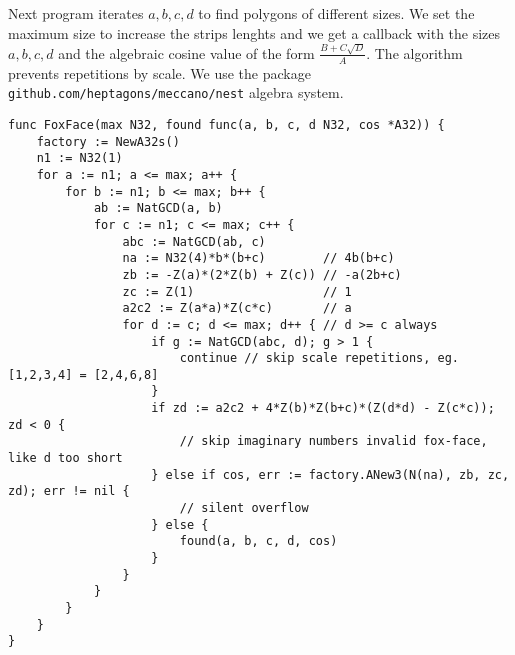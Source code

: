 \documentclass[11pt]{article}
\begin{document}
Next program iterates $a,b,c,d$ to find polygons of different sizes.
We set the maximum size to increase the strips lenghts and we get a callback with the
sizes $a,b,c,d$ and the algebraic cosine value of the form $\frac{B+C\sqrt{D}}{A}$. The algorithm prevents repetitions
by scale. We use the package \texttt{github.com/heptagons/meccano/nest} algebra system.
\begin{lstlisting}
func FoxFace(max N32, found func(a, b, c, d N32, cos *A32)) {
	factory := NewA32s()
	n1 := N32(1)
	for a := n1; a <= max; a++ {
		for b := n1; b <= max; b++ {
			ab := NatGCD(a, b)
			for c := n1; c <= max; c++ {
				abc := NatGCD(ab, c)
				na := N32(4)*b*(b+c)        // 4b(b+c)
				zb := -Z(a)*(2*Z(b) + Z(c)) // -a(2b+c)
				zc := Z(1)                  // 1
				a2c2 := Z(a*a)*Z(c*c)       // a
				for d := c; d <= max; d++ { // d >= c always
					if g := NatGCD(abc, d); g > 1 {
						continue // skip scale repetitions, eg. [1,2,3,4] = [2,4,6,8]
					}
					if zd := a2c2 + 4*Z(b)*Z(b+c)*(Z(d*d) - Z(c*c)); zd < 0 {
						// skip imaginary numbers invalid fox-face, like d too short
					} else if cos, err := factory.ANew3(N(na), zb, zc, zd); err != nil {
						// silent overflow
					} else {
						found(a, b, c, d, cos)
					}
				}
			}
		}
	}
}
\end{lstlisting}

\newcommand{\foxface}[6]{ %
 \begin{tikzpicture}
 \def\a{#3};\def\b{#4};\def\c{#5};\def\d{#6};\def\bc{#4+#5}
 \pgfmathsetmacro\max{max(#3,#4+#5)} %
 \pgfmathsetmacro\aA{-1.0*#3*(2.0*#4+#5)}
 \pgfmathsetmacro\aB{pow(#3,2)*pow(#5,2) + 4.0*#4*(#4+#5)*(pow(#6,2)-pow(#5,2)}
 \pgfmathsetmacro\aC{\aA + sqrt(\aB))/(4.0*#4*(#4+#5))}
 \pgfmathsetmacro\angleA{acos(\aC)}
 \pgfmathsetmacro\angleB{acos((pow(#5,2) + pow(#6,2) - pow(#3+2.0*#4*\aC,2))/(2.0*#5*#6))}
 \begin{scope}
  \meccanostrip[0000FF]{\a}{#1}{#2} %
 \end{scope}
 \begin{scope}[shift={(#1*\a,0)},rotate=\angleA]
  \meccanostrip[00FF00]{\max}{#1}{#2} %
  \begin{scope}[shift={(#1*\bc,0)},rotate=180-\angleB]
   \meccanostrip[FF0000]{\d}{#1}{#2}; %
  \end{scope}
 \end{scope}
 \begin{scope}[rotate=180-\angleA]
  \meccanostrip[00FF00]{\max}{#1}{#2} %
  \begin{scope}[shift={(#1*\bc,0)},rotate=\angleB-180]
   \meccanostrip[FF0000]{\d}{#1}{#2}; %
  \end{scope}
 \end{scope}
 \end{tikzpicture}
}
\end{document}
